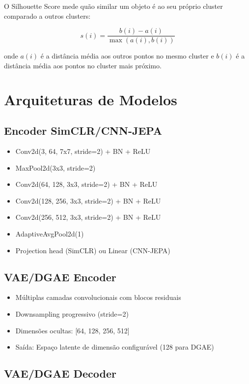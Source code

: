 O Silhouette Score mede quão similar um objeto é ao seu próprio cluster comparado a outros clusters:

\[
s(i) = \frac{b(i) - a(i)}{\max(a(i), b(i))}
\]

onde $a(i)$ é a distância média aos outros pontos no mesmo cluster e $b(i)$ é a distância média aos pontos no cluster mais próximo.

\section{Arquiteturas de Modelos}

\subsection{Encoder SimCLR/CNN-JEPA}

\begin{itemize}
    \item Conv2d(3, 64, 7x7, stride=2) + BN + ReLU
    \item MaxPool2d(3x3, stride=2)
    \item Conv2d(64, 128, 3x3, stride=2) + BN + ReLU
    \item Conv2d(128, 256, 3x3, stride=2) + BN + ReLU
    \item Conv2d(256, 512, 3x3, stride=2) + BN + ReLU
    \item AdaptiveAvgPool2d(1)
    \item Projection head (SimCLR) ou Linear (CNN-JEPA)
\end{itemize}

\subsection{VAE/DGAE Encoder}

\begin{itemize}
    \item Múltiplas camadas convolucionais com blocos residuais
    \item Downsampling progressivo (stride=2)
    \item Dimensões ocultas: [64, 128, 256, 512]
    \item Saída: Espaço latente de dimensão configurável (128 para DGAE)
\end{itemize}

\subsection{VAE/DGAE Decoder}

